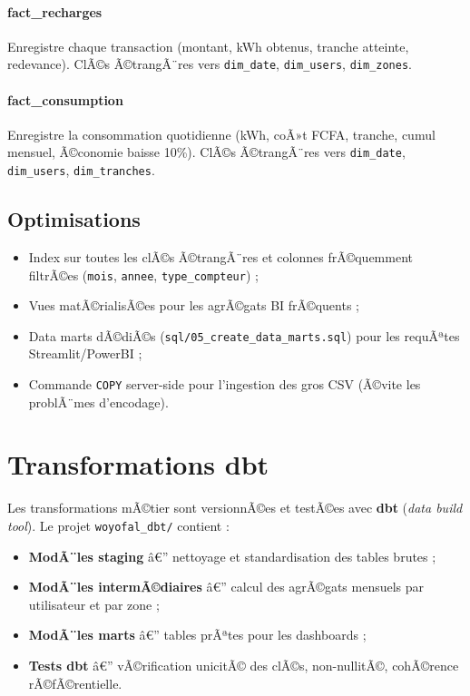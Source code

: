 \documentclass[12pt,a4paper]{report}
\begin{document}
\paragraph{fact\_recharges} Enregistre chaque transaction (montant, kWh obtenus, tranche atteinte, redevance). ClÃ©s Ã©trangÃ¨res vers \texttt{dim\_date}, \texttt{dim\_users}, \texttt{dim\_zones}.

\paragraph{fact\_consumption} Enregistre la consommation quotidienne (kWh, coÃ»t FCFA, tranche, cumul mensuel, Ã©conomie baisse 10\%). ClÃ©s Ã©trangÃ¨res vers \texttt{dim\_date}, \texttt{dim\_users}, \texttt{dim\_tranches}.

\subsection{Optimisations}

\begin{itemize}
  \item Index sur toutes les clÃ©s Ã©trangÃ¨res et colonnes frÃ©quemment filtrÃ©es (\texttt{mois}, \texttt{annee}, \texttt{type\_compteur}) ;
  \item Vues matÃ©rialisÃ©es pour les agrÃ©gats BI frÃ©quents ;
  \item Data marts dÃ©diÃ©s (\texttt{sql/05\_create\_data\_marts.sql}) pour les requÃªtes Streamlit/PowerBI ;
  \item Commande \texttt{COPY} server-side pour l'ingestion des gros CSV (Ã©vite les problÃ¨mes d'encodage).
\end{itemize}

\section{Transformations dbt}

Les transformations mÃ©tier sont versionnÃ©es et testÃ©es avec \textbf{dbt} (\textit{data build tool}). Le projet \texttt{woyofal\_dbt/} contient :

\begin{itemize}
  \item \textbf{ModÃ¨les staging} â€” nettoyage et standardisation des tables brutes ;
  \item \textbf{ModÃ¨les intermÃ©diaires} â€” calcul des agrÃ©gats mensuels par utilisateur et par zone ;
  \item \textbf{ModÃ¨les marts} â€” tables prÃªtes pour les dashboards ;
  \item \textbf{Tests dbt} â€” vÃ©rification unicitÃ© des clÃ©s, non-nullitÃ©, cohÃ©rence rÃ©fÃ©rentielle.
\end{itemize}
\end{document}
